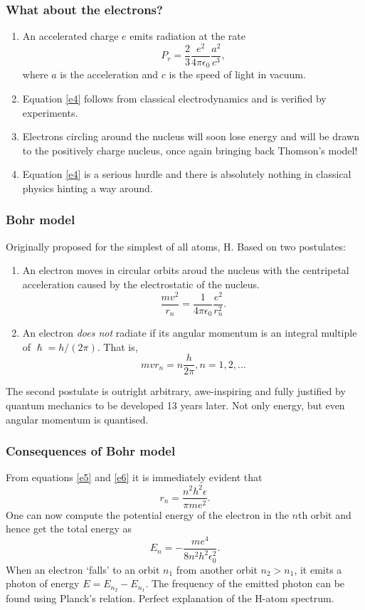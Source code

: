 \documentclass{beamer}
\begin{document}
\begin{frame}
\frametitle{What about the electrons?}
\begin{enumerate}
\item An accelerated charge $e$ emits radiation at the rate
\begin{equation}\label{e4}
P_r = \frac{2}{3}\frac{e^2}{4\pi\epsilon_0}\frac{a^2}{c^3},
\end{equation}
where $a$ is the acceleration and $c$ is the speed of light in vacuum.
\item Equation \eqref{e4} follows from classical electrodynamics and is verified
by experiments.
\item Electrons circling around the nucleus will soon lose energy and will be
drawn to the positively charge nucleus, once again bringing back Thomson's model!
\item Equation \eqref{e4} is a serious hurdle and there is absolutely nothing in
classical physics hinting a way around.
\end{enumerate}
\end{frame}

\begin{frame}
\frametitle{Bohr model}
Originally proposed for the simplest of all atoms, H. Based on two postulates:
\begin{enumerate}
\item An electron moves in circular orbits aroud the nucleus with the 
centripetal acceleration caused by the electrostatic of the nucleus.
\begin{equation}\label{e5}
\frac{mv^2}{r_n} = \frac{1}{4\pi\epsilon_0}\frac{e^2}{r_n^2}.
\end{equation} 
\item An electron \emph{does not} radiate if its angular momentum is an integral
multiple of $\hslash = h/(2\pi)$. That is,
\begin{equation}\label{e6}
mvr_n = n\frac{h}{2\pi}, n = 1, 2, \ldots
\end{equation}
\end{enumerate}
The second postulate is outright arbitrary, awe-inspiring and fully justified by
quantum mechanics to be developed 13 years later. Not only energy, but even 
angular momentum is quantised.
\end{frame}

\begin{frame}
\frametitle{Consequences of Bohr model}
From equations \eqref{e5} and \eqref{e6} it is immediately evident that
\begin{equation}\label{e7}
r_n = \frac{n^2h^2\epsilon}{\pi me^2}.
\end{equation}
One can now compute the potential energy of the electron in the $n$th orbit and 
hence get the total energy as
\begin{equation}\label{e8}
E_n = -\frac{me^4}{8n^2h^2\epsilon_0^2}.
\end{equation}
When an electron `falls' to an orbit $n_1$ from another orbit $n_2 > n_1$, it 
emits a photon of energy $E = E_{n_2} - E_{n_1}$. The frequency of the emitted
photon can be found using Planck's relation. Perfect explanation of the H-atom
spectrum.
\end{frame}
\end{document}
